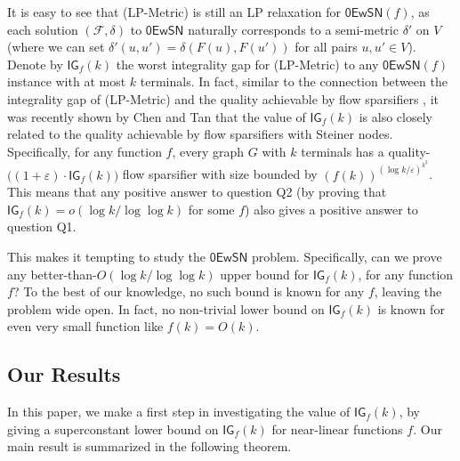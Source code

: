 \documentclass[11pt]{article}
\theoremstyle{definition}
\newcommand{\fset}{{\mathcal{F}}}
\newcommand{\eps}{{\varepsilon}}
\newcounter{note}
\newcommand{\zesn}{\mathsf{0EwSN}}
\begin{document}
\begin{titlepage}
It is easy to see that (\textsf{LP-Metric}) is still an LP relaxation for $\zesn(f)$, as each solution $(\fset,\delta)$ to $\zesn$ naturally corresponds to a semi-metric $\delta'$ on $V$ (where we can set $\delta'(u,u')=\delta(F(u),F(u'))$ for all pairs $u,u'\in V$). 
Denote by $\textsf{IG}_f(k)$ the worst integrality gap for (\textsf{LP-Metric}) to any $\zesn(f)$ instance with at most $k$ terminals.
In fact, similar to the connection between the integrality gap of (\textsf{LP-Metric}) and the quality achievable by flow sparsifiers \cite{moitra2009approximation,leighton2010extensions},
it was recently shown by Chen and Tan \cite{chen20241+} that the value of $\textsf{IG}_f(k)$ is also closely related to the quality achievable by flow sparsifiers with Steiner nodes.
Specifically, for any function $f$, every graph $G$ with $k$ terminals has a quality-$\big((1+\eps)\cdot \textsf{IG}_f(k)\big)$ flow sparsifier with size bounded by $(f(k))^{(\log k/\eps)^{k^2}}$. 
This means that any positive answer to question Q2 (by proving that $\textsf{IG}_f(k)=o(\log k/\log\log k)$ for some $f$) also gives a positive answer to question Q1.

This makes it tempting to study the $\zesn$ problem. Specifically, can we prove any better-than-$O(\log k/\log\log k)$ upper bound for $\textsf{IG}_f(k)$, for any function $f$?
To the best of our knowledge, no such bound is known for any $f$, leaving the problem wide open. 
In fact, no non-trivial lower bound on $\textsf{IG}_f(k)$ is known for even very small function like $f(k)=O(k)$.


\subsection{Our Results}

In this paper, we make a first step in investigating the value of  $\textsf{IG}_f(k)$, by giving a superconstant lower bound on $\textsf{IG}_f(k)$ for near-linear functions $f$.
Our main result is summarized in the following theorem.


\end{titlepage}
\end{document}
